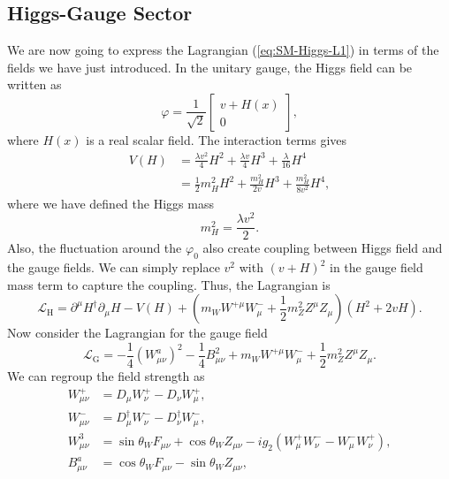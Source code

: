 \subsection{Higgs-Gauge Sector}
We are now going to express the Lagrangian (\ref{eq:SM-Higgs-L1}) in terms of the fields we have just introduced.
In the unitary gauge, the Higgs field can be written as
\begin{equation}
	\varphi = \frac{1}{\sqrt 2} \begin{bmatrix}
		v + H(x) \\ 0
	\end{bmatrix},
\end{equation}
where $H(x)$ is a real scalar field.
The interaction terms gives
\begin{equation}
\begin{aligned}
	V(H) &= \frac{\lambda v^2}{4} H^2 + \frac{\lambda v}{4}H^3 + \frac{\lambda}{16}H^4 \\
	&= \frac{1}{2}m_H^2 H^2 + \frac{m_H^2}{2v} H^3 + \frac{m_H^2}{8v^2}H^4,
\end{aligned} 
\end{equation}
where we have defined the Higgs mass
\begin{equation}
	m_H^2 = \frac{\lambda v^2}{2}.
\end{equation}
Also, the fluctuation around the $\varphi_0$ also create coupling between Higgs field and the gauge fields.
We can simply replace $v^2$ with $(v+H)^2$ in the gauge field mass term to capture the coupling.
Thus, the Lagrangian is
\begin{equation}
	\mathcal L_{\mathrm{H}} = \partial^\mu H^\dagger \partial_\mu H - V(H) + \left(m_W W^{+\mu} W_\mu^- + \frac{1}{2}m_Z^2 Z^\mu Z_\mu \right) \left(H^2+2vH \right).
\end{equation}
Now consider the Lagrangian for the gauge field
\begin{equation}
	\mathcal L_{\mathrm{G}} = -\frac{1}{4}(W^a_{\mu\nu})^2 - \frac{1}{4}B_{\mu\nu}^2 + m_W W^{+\mu} W_\mu^- + \frac{1}{2}m_Z^2 Z^\mu Z_\mu.
\end{equation}
We can regroup the field strength as
\begin{equation}
\begin{aligned}
	W^+_{\mu\nu} &= D_\mu W_\nu^+ - D_\nu W^+_\mu, \\
	W^-_{\mu\nu} &= D_\mu^\dagger W_\nu^- - D_\nu^\dagger W^-_\mu, \\
	W^3_{\mu\nu} &= \sin{\theta_W} F_{\mu\nu} + \cos{\theta_W}Z_{\mu\nu} -ig_2(W^+_\mu W^-_\nu - W_\mu^- W_\nu^+), \\
	B^a_{\mu\nu} &= \cos{\theta_W} F_{\mu\nu} - \sin{\theta_W} Z_{\mu\nu},
\end{aligned}
\end{equation}
